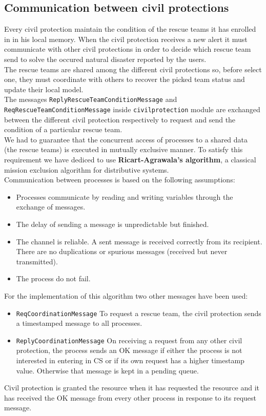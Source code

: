 \documentclass[a4paper,12pt]{report}
\begin{document}
\subsection{Communication between civil protections}
Every civil protection maintain the condition of the rescue teams it has enrolled in in his local memory. 
When the civil protection receives a new alert it must communicate with other civil protections in order to decide which rescue team send to solve the occured natural disaster reported by the users.\\
The rescue teams are shared among the different civil protections so, before select one, they must coordinate with others to recover the picked team status and update their local model.\\
The messages \texttt{ReplyRescueTeamConditionMessage} and\\ \texttt{ReqRescueTeamConditionMessage} inside \texttt{civilprotection} module are exchanged between the different civil protection respectively to request and send the condition of a particular rescue team.\\

We had to guarantee that the concurrent access of processes to a shared data (the rescue teams) is executed in mutually exclusive manner.
To satisfy this requirement we have dediced to use \textbf{ Ricart-Agrawala's algorithm}, a classical mission exclusion algorithm for distributive systems.\\

Communication between processes is based on the following assumptions:
\begin{itemize}
\item Processes communicate by reading and writing variables through the exchange of messages.
\item The delay of sending a message is unpredictable but finished.
\item The channel is reliable. A sent message is received correctly from its recipient. There are no duplications or spurious messages (received but never transmitted). 
\item The process do not fail. 
\end{itemize}

For the implementation of this algorithm two other messages have been used:
\begin{itemize}
\item \texttt{ReqCoordinationMessage}
To request a rescue team, the civil protection sends a timestamped message to all processes.
\item \texttt{ReplyCoordinationMessage}
On receiving a request from any other civil protection, the process sends an OK message if either the process is not interested in entering in CS or if its own request has a higher timestamp value. Otherwise that message is kept in a pending queue.
\end{itemize}
Civil protection is granted the resource when it has requested the resource and it has received the OK message from every other
process in response to its request message.\\
\end{document}

